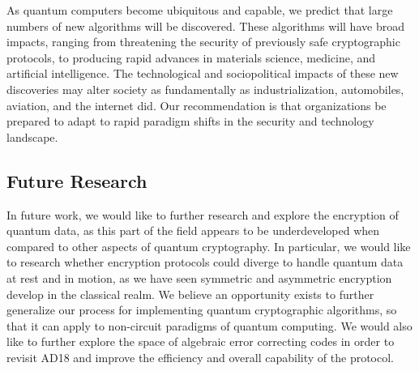 \documentclass[sigconf]{acmart}
\begin{document}
As quantum computers become ubiquitous and capable, we predict that large numbers of new algorithms will be discovered. These algorithms will have broad impacts, ranging from threatening the security of previously safe cryptographic protocols, to producing rapid advances in materials science, medicine, and artificial intelligence. The technological and sociopolitical impacts of these new discoveries may alter society as fundamentally as industrialization, automobiles, aviation, and the internet did. Our recommendation is that organizations be prepared to adapt to rapid paradigm shifts in the security and technology landscape.

\subsection{Future Research}
In future work, we would like to further research and explore the encryption of quantum data, as this part of the field appears to be underdeveloped when compared to other aspects of quantum cryptography. In particular, we would like to research whether encryption protocols could diverge to handle quantum data at rest and in motion, as we have seen symmetric and asymmetric encryption develop in the classical realm. We believe an opportunity exists to further generalize our process for implementing quantum cryptographic algorithms, so that it can apply to non-circuit paradigms of quantum computing. We would also like to further explore the space of algebraic error correcting codes in order to revisit AD18 and improve the efficiency and overall capability of the protocol. %

{}

\end{document}
